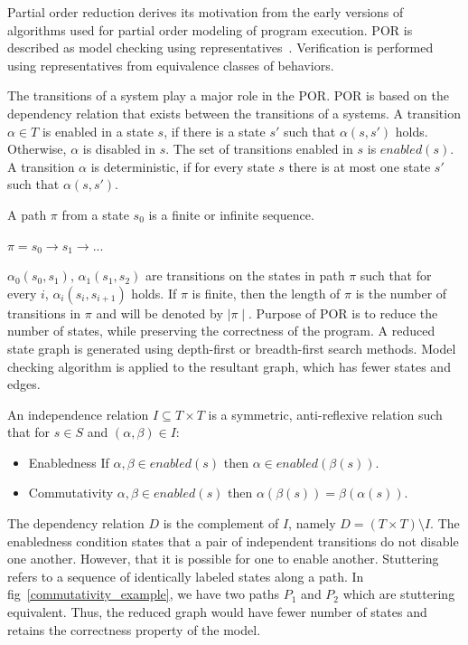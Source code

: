 Partial order reduction derives its motivation from the early versions of algorithms used for partial order modeling of program execution. 
POR is described as model checking using representatives~\citep{por_repr}. 
Verification is performed using representatives from equivalence classes of behaviors. 

The transitions of a system play a major role in the POR. 
POR is based on the dependency relation that exists between the transitions of a systems. 
A transition $\alpha \in T$ is enabled in a state $s$, if there is a state $s'$ such that $\alpha(s, s')$ holds. 
Otherwise, $\alpha$ is disabled in $s$. 
The set of transitions enabled in $s$ is $enabled(s)$. 
A transition $\alpha$ is deterministic, if for every state $s$ there is at most one state $s'$ such that $\alpha(s, s')$. 

A path $\pi$ from a state $s_0$ is a finite or infinite sequence. 

$\pi = s_0 \rightarrow s_1 \rightarrow ...$

$\alpha_0(s_0, s_1)$, $\alpha_1(s_1, s_2)$ are transitions on the states in path $\pi$ such that for every $i$, $\alpha_i(s_i, s_{i+1})$ holds. 
If $\pi$ is finite, then the length of $\pi$ is the number of transitions in $\pi$ and will be denoted by $\mid \pi \mid$. 
Purpose of POR is to reduce the number of states, while preserving the correctness of the program. 
A reduced state graph is generated using depth-first or breadth-first search methods. 
Model checking algorithm is applied to the resultant graph, which has fewer states and edges. 

An independence relation $I \subseteq T \times T$ is a symmetric, anti-reflexive relation such that for $s \in S$ and $(\alpha, \beta) \in I$:
\begin{itemize}
\item Enabledness 	If $\alpha,\beta \in enabled(s)$ then $\alpha \in enabled(\beta(s))$.
\item Commutativity	$\alpha, \beta \in enabled(s)$ then $\alpha(\beta(s)) = \beta(\alpha(s))$.
\end{itemize}
The dependency relation $D$ is the complement of $I$, namely $D = (T \times T) \setminus I$. The enabledness condition states that a pair of independent transitions do not disable one another. 
However, that it is possible for one to enable another. 
Stuttering refers to a sequence of identically labeled states along a path. 
In fig~\ref{commutativity_example}, we have two paths $P_1$ and $P_2$ which are stuttering equivalent. 
Thus, the reduced graph would have fewer number of states and retains the correctness property of the model. 

